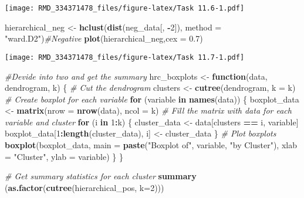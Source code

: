 \documentclass[
]{article}
\newenvironment{Shaded}{\begin{snugshade}}{\end{snugshade}}
\newcommand{\AttributeTok}[1]{\textcolor[rgb]{0.13,0.29,0.53}{#1}}
\newcommand{\CommentTok}[1]{\textcolor[rgb]{0.56,0.35,0.01}{\textit{#1}}}
\newcommand{\ControlFlowTok}[1]{\textcolor[rgb]{0.13,0.29,0.53}{\textbf{#1}}}
\newcommand{\DecValTok}[1]{\textcolor[rgb]{0.00,0.00,0.81}{#1}}
\newcommand{\FloatTok}[1]{\textcolor[rgb]{0.00,0.00,0.81}{#1}}
\newcommand{\FunctionTok}[1]{\textcolor[rgb]{0.13,0.29,0.53}{\textbf{#1}}}
\newcommand{\NormalTok}[1]{#1}
\newcommand{\OtherTok}[1]{\textcolor[rgb]{0.56,0.35,0.01}{#1}}
\newcommand{\SpecialCharTok}[1]{\textcolor[rgb]{0.81,0.36,0.00}{\textbf{#1}}}
\newcommand{\StringTok}[1]{\textcolor[rgb]{0.31,0.60,0.02}{#1}}
\begin{document}
\texttt{[image: RMD\_334371478\_files/figure-latex/Task 11.6-1.pdf]}

\begin{Shaded}
\begin{Highlighting}[]
\NormalTok{hierarchical\_neg }\OtherTok{\textless{}{-}} \FunctionTok{hclust}\NormalTok{(}\FunctionTok{dist}\NormalTok{(neg\_data[, }\SpecialCharTok{{-}}\DecValTok{2}\NormalTok{]), }\AttributeTok{method =} \StringTok{"ward.D2"}\NormalTok{)}\CommentTok{\#Negative}
\FunctionTok{plot}\NormalTok{(hierarchical\_neg,}\AttributeTok{cex =} \FloatTok{0.7}\NormalTok{)}
\end{Highlighting}
\end{Shaded}

\texttt{[image: RMD\_334371478\_files/figure-latex/Task 11.7-1.pdf]}

\begin{Shaded}
\begin{Highlighting}[]
\CommentTok{\#Devide into two and get the summary}
\NormalTok{hrc\_boxplots }\OtherTok{\textless{}{-}} \ControlFlowTok{function}\NormalTok{(data, dendrogram, k) \{}
  \CommentTok{\# Cut the dendrogram}
\NormalTok{  clusters }\OtherTok{\textless{}{-}} \FunctionTok{cutree}\NormalTok{(dendrogram, }\AttributeTok{k =}\NormalTok{ k)}
  \CommentTok{\# Create boxplot for each variable}
  \ControlFlowTok{for}\NormalTok{ (variable }\ControlFlowTok{in} \FunctionTok{names}\NormalTok{(data)) \{}
\NormalTok{    boxplot\_data }\OtherTok{\textless{}{-}} \FunctionTok{matrix}\NormalTok{(}\AttributeTok{nrow =} \FunctionTok{nrow}\NormalTok{(data), }\AttributeTok{ncol =}\NormalTok{ k)}
    \CommentTok{\# Fill the matrix with data for each variable and cluster}
    \ControlFlowTok{for}\NormalTok{ (i }\ControlFlowTok{in} \DecValTok{1}\SpecialCharTok{:}\NormalTok{k) \{}
\NormalTok{      cluster\_data }\OtherTok{\textless{}{-}}\NormalTok{ data[clusters }\SpecialCharTok{==}\NormalTok{ i, variable]}
\NormalTok{      boxplot\_data[}\DecValTok{1}\SpecialCharTok{:}\FunctionTok{length}\NormalTok{(cluster\_data), i] }\OtherTok{\textless{}{-}}\NormalTok{ cluster\_data}
\NormalTok{    \}}
    \CommentTok{\# Plot boxplots}
    \FunctionTok{boxplot}\NormalTok{(boxplot\_data, }
            \AttributeTok{main =} \FunctionTok{paste}\NormalTok{(}\StringTok{"Boxplot of"}\NormalTok{, variable, }\StringTok{"by Cluster"}\NormalTok{),}
            \AttributeTok{xlab =} \StringTok{"Cluster"}\NormalTok{, }\AttributeTok{ylab =}\NormalTok{ variable)}
\NormalTok{  \}}
\NormalTok{\}}

\CommentTok{\# Get summary statistics for each cluster}
\FunctionTok{summary}\NormalTok{ (}\FunctionTok{as.factor}\NormalTok{(}\FunctionTok{cutree}\NormalTok{(hierarchical\_pos, }\AttributeTok{k=}\DecValTok{2}\NormalTok{)))}
\end{Highlighting}
\end{Shaded}
\end{document}
